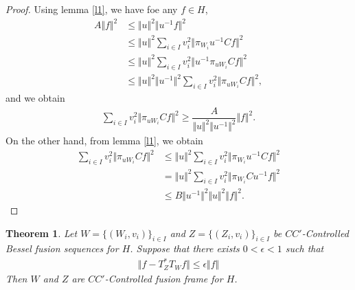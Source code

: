 \documentclass{mfatshort}
\newtheorem{theorem}{Theorem}[section]
\begin{document}
\begin{proof}
Using lemma \ref{l1}, we have foe any $f\in H$,
\begin{align*}
A\Vert f\Vert ^{2}&\leq\Vert u\Vert^2 \Vert u^{-1}f\Vert^2\\
&\leq\Vert u\Vert^2\sum _{i \in I} v_{i}^{2}\Vert \pi _{W_{i}}
u^{-1}Cf\Vert ^{2}\\
&\leq\Vert u\Vert^{2} \sum _{i \in I} v_{i}^{2}\Vert u^{-1}\pi
_{uW_{i}}Cf\Vert ^{2}\\
&\leq\Vert u\Vert^2 \Vert u^{-1}\Vert^2\sum_{i\in I}v_i^2\Vert
\pi_{uW_i}Cf\Vert^2,
\end{align*}
and we obtain
\begin{align*}
 \sum _{i \in I} v_{i}^{2}\Vert \pi _{uW_{i}}Cf\Vert ^{2}\geq\dfrac{A}{\Vert u \Vert^{2}\Vert u^{-1}\Vert^{2}}\Vert
 f\Vert^{2}.
\end{align*}
On the other hand, from lemma \ref{l1}, we obtain
\begin{align*}
\sum _{i \in I} v_{i}^{2} \Vert  \pi _{uW_{i}}Cf\Vert ^{2}&\leq \Vert u\Vert^{2}\sum _{i \in I} v_{i}^{2}\Vert
\pi _{W_{i}}u^{-1}Cf\Vert ^{2}\\
&=\Vert u\Vert^2\sum_{i\in I}v_i^2\Vert \pi_{W_i}C u^{-1}f\Vert^2\\
&\leq B \Vert  u^{-1}\Vert^{2}\Vert  u \Vert^{2} \Vert f\Vert^{2}.
\end{align*}
\end{proof}
\begin{theorem}
Let  $W=\lbrace(W_{i},v_{i})\rbrace _{i \in I}$ and $Z=\lbrace(Z_{i},v_{i})\rbrace _{i \in I}$  be $CC'$-Controlled Bessel fusion sequences for $H$. Suppose that there exists $0<\epsilon< 1$ such that 
\begin{align*}
\Vert f-T^{*}_{Z}T_ {W}f \Vert \leq \epsilon \Vert f \Vert
\end{align*}
Then $W$ and $Z$  are $CC'$-Controlled fusion frame for $H$.
\end{theorem}
\end{document}

